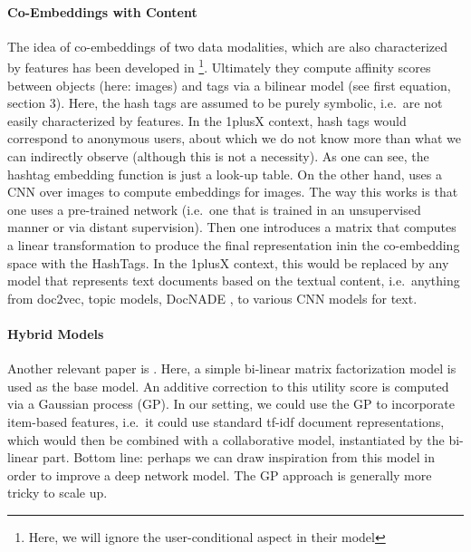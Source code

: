 \documentclass{article}
\begin{document}
\paragraph{Co-Embeddings with Content}

The idea of co-embeddings of two data modalities, which are also characterized by features has been developed in \cite{denton2015user}\footnote{Here, we will ignore the user-conditional aspect in their model}. Ultimately they compute affinity scores between objects (here: images) and tags via a bilinear model (see first equation, section 3). Here, the hash tags are assumed to be purely symbolic, i.e.~are not easily characterized by features. In the 1plusX context, hash tags would correspond to anonymous users, about which we do not know more than what we can indirectly observe (although this is not a necessity). As one can see, the hashtag embedding function is just a look-up table. On the other hand, \cite{denton2015user} uses a CNN over images to compute embeddings for images. The  way this works is that one uses a pre-trained network (i.e.~one that is trained in an unsupervised manner or via distant supervision). Then one introduces a matrix that computes a linear transformation to produce the final representation inin the co-embedding space with the HashTags. In the 1plusX context, this would be replaced by any model that represents text documents based on the textual content, i.e.~anything from doc2vec, topic models, DocNADE \cite{larochelle2012neural}, to various CNN models for text.

\paragraph{Hybrid Models} 

Another relevant paper is \cite{khan2014scalable}. Here, a simple bi-linear matrix factorization model is used as the base model. An additive correction to this utility score is computed via a Gaussian process (GP). In our setting, we could use the GP to incorporate item-based features, i.e.~it could use standard tf-idf document representations, which would then be combined with a collaborative model, instantiated by the bi-linear part. Bottom line: perhaps we can draw inspiration from this model in order to improve a deep network model. The GP approach is generally more tricky to scale up. 



\end{document}
